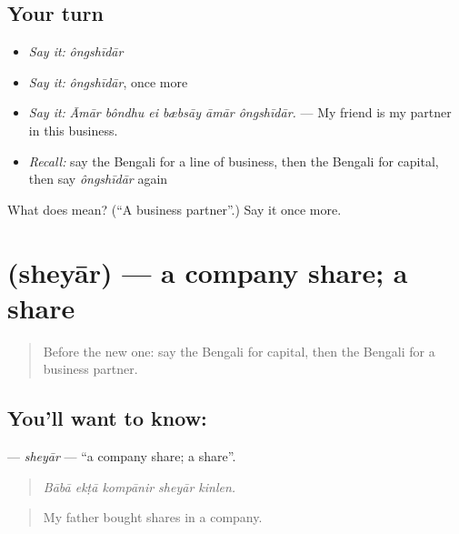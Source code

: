 \subsection*{Your turn}
\begin{itemize}
\raggedright
  \item \emph{Say it:} \emph{ôngshīdār}
  \item \emph{Say it:} \emph{ôngshīdār}, once more
  \item \emph{Say it:} \emph{Āmār bôndhu ei bæbsāy āmār ôngshīdār.} — My friend is my partner in this business.
  \item \emph{Recall:} say the Bengali for a line of business, then the Bengali for capital, then say \emph{ôngshīdār} again
\end{itemize}

\begin{tcolorbox}[breakable,colback=teal!4,colframe=teal!35!black,title={Before you move on}]
What does  mean? (\textquotedblleft{}A business partner\textquotedblright{}.) Say it once more.
\end{tcolorbox}
\section[\texorpdfstring{\bn{শেয়ার} (sheyār)}{শেয়ার (sheyār)}]{ (sheyār) — a company share; a share}

\label{lesson:BN-C498-sheyar}



\begin{quote}
Before the new one: say the Bengali for capital, then the Bengali for a business partner.
\end{quote}

\subsection*{You'll want to know: }
\textbf{} — \emph{sheyār} — \textquotedblleft{}a company share; a share\textquotedblright{}.

\begin{quote}
    
\end{quote}

\begin{quote}
\emph{Bābā ekṭā kompānir sheyār kinlen.}
\end{quote}

\begin{quote}
My father bought shares in a company.
\end{quote}

